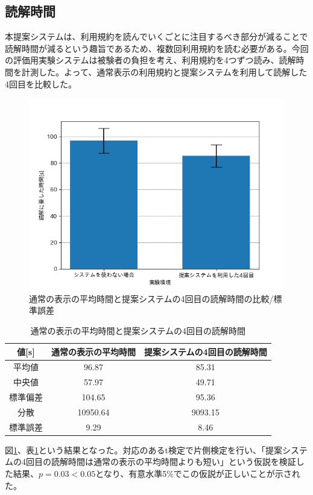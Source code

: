 \subsection{読解時間}
本提案システムは、利用規約を読んでいくごとに注目するべき部分が減ることで読解時間が減るという趣旨であるため、複数回利用規約を読む必要がある。今回の評価用実験システムは被験者の負担を考え、利用規約を4つずつ読み、読解時間を計測した。よって、通常表示の利用規約と提案システムを利用して読解した4回目を比較した。
\begin{figure}[h]
  \begin{center}
      \includegraphics[width=13cm]{img/tgraph4.png}
      \caption{通常の表示の平均時間と提案システムの4回目の読解時間の比較/標準誤差}
      \label{img:通常の表示の平均時間と提案システムの4回目の読解時間の比較/標準誤差}
  \end{center}
\end{figure}
\begin{table}[h]
  \caption{通常の表示の平均時間と提案システムの4回目の読解時間}
  \label{tab:通常の表示の平均時間と提案システムの4回目の読解時間}
  \centering
  \begin{tabular}{ccc}
    \hline
    値[s]  & 通常の表示の平均時間  &  提案システムの4回目の読解時間  \\
    \hline \hline
    平均値  & 96.87  & 85.31 \\
    中央値  & 57.97   & 49.71 \\
    標準偏差  & 104.65  & 95.36 \\
    分散  &  10950.64  &  9093.15 \\
    標準誤差  &  9.29  &  8.46 \\
    \hline
  \end{tabular}
\end{table}
図\ref{img:通常の表示の平均時間と提案システムの4回目の読解時間の比較/標準誤差}、表\ref{tab:通常の表示の平均時間と提案システムの4回目の読解時間}という結果となった。対応のあるt検定で片側検定を行い、「提案システムの4回目の読解時間は通常の表示の平均時間よりも短い」という仮説を検証した結果、$p=0.03<0.05$となり、有意水準5\%でこの仮説が正しいことが示された。

